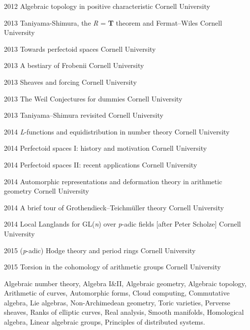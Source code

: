 \documentclass[11pt, letterpaper]{awesome-cv}
\begin{document}
\begin{cvhonors}
	\cvhonor
	{2012}
	{Algebraic topology in positive characteristic}
	{Cornell University}
	
	\cvhonor
	{2013}
	{Taniyama-Shimura, the \emph{R} = \textbf{T} theorem and Fermat--Wiles}
	{Cornell University}
	
	\cvhonor
	{2013}
	{Towards perfectoid spaces}
	{Cornell University}
	
	\cvhonor
	{2013}
	{A bestiary of Frobenii}
	{Cornell University}
	
	\cvhonor
	{2013}
	{Sheaves and forcing}
	{Cornell University}
	
	\cvhonor
	{2013}
	{The Weil Conjectures for dummies}
	{Cornell University}
	
	\cvhonor
	{2013}
	{Taniyama--Shimura revisited}
	{Cornell University}
	
	\cvhonor
	{2014}
	{\emph{L}-functions and equidistribution in number theory}
	{Cornell University}
	
	\cvhonor
	{2014}
	{Perfectoid spaces I: history and motivation}
	{Cornell University}
	
	\cvhonor
	{2014}
	{Perfectoid spaces II: recent applications}
	{Cornell University}
	
	\cvhonor
	{2014}
	{Automorphic representations and deformation theory in arithmetic geometry}
	{Cornell University}

	\cvhonor
	{2014}
	{A brief tour of Grothendieck--Teichm\"uller theory}
	{Cornell University}
	
	\cvhonor
	{2014}
	{Local Langlands for GL(\emph{n}) over \emph{p}-adic fields [after Peter Scholze]}
	{Cornell University}
	
	\cvhonor
	{2015}
	{(\emph{p}-adic) Hodge theory and period rings}
	{Cornell University}
	
	\cvhonor
	{2015}
	{Torsion in the cohomology of arithmetic groups}
	{Cornell University}
\end{cvhonors}






\begin{cvparagraph}
Algebraic number theory, Algebra I\&II, Algebraic geometry, Algebraic topology, 
Arithmetic of curves, Automorphic forms, Cloud computing, Commutative algebra, 
Lie algebras, Non-Archimedean geometry, Toric varieties, Perverse sheaves, 
Ranks of elliptic curves, Real analysis, Smooth manifolds, Homological algebra, 
Linear algebraic groups, Principles of distributed systems.
\end{cvparagraph}
\end{document}
